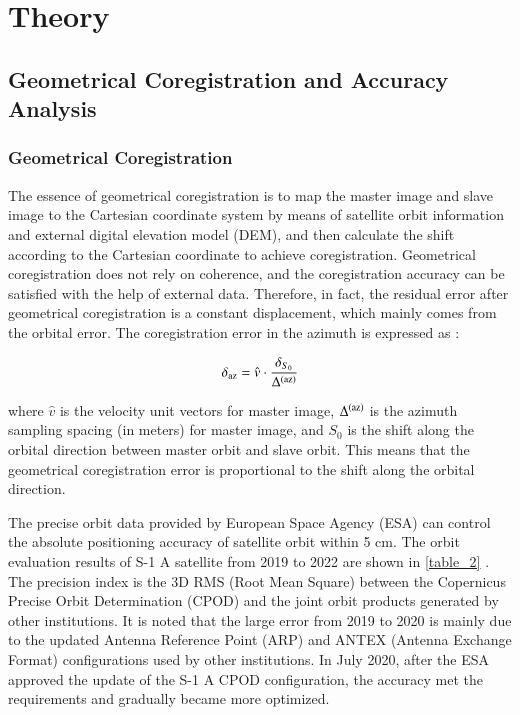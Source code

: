 \documentclass[preprint, authoryear]{elsarticle}
\begin{document}
\section{Theory}
\label{sec:2}


\subsection{Geometrical Coregistration and Accuracy Analysis}
\subsubsection{Geometrical Coregistration}

The essence of geometrical coregistration is to map the master image and slave image to the Cartesian coordinate system by means of satellite orbit information and external digital elevation model (DEM), and then calculate the shift according to the Cartesian coordinate to achieve coregistration. Geometrical coregistration does not rely on coherence, and the coregistration accuracy can be satisfied with the help of external data. Therefore, in fact, the residual error after geometrical coregistration is a constant displacement, which mainly comes from the orbital error. The coregistration error in the azimuth is expressed as \cite{Geometrical_SAR_image_registration}: \par

\begin{equation}
    \delta_{\rm az} = \hat{v} \cdot \frac{\delta_{S_0}}{\Delta^{({\rm az})}}
    \label{eq_8}
\end{equation}

\noindent where $\hat{v}$ is the velocity unit vectors for master image, $\Delta^{({\rm az})}$ is the azimuth sampling spacing (in meters) for master image, and $S_0$ is the shift along the orbital direction between master orbit and slave orbit. This means that the geometrical coregistration error is proportional to the shift along the orbital direction. \par
The precise orbit data provided by European Space Agency (ESA) can control the absolute positioning accuracy of satellite orbit within 5 cm. The orbit evaluation results of S-1 A satellite from 2019 to 2022 are shown in \ref{table_2} \cite{copernicus_review_2015.10-2019.09, copernicus_review_2019.10-2020.01, copernicus_review_2020.02-2020.05, copernicus_review_2020.06-2020.09, copernicus_review_2020.10-2020.12, copernicus_review_2021.01-2021.12, copernicus_review_2022.01-2022.12}. The precision index is the 3D RMS (Root Mean Square) between the Copernicus Precise Orbit Determination (CPOD) and the joint orbit products generated by other institutions. It is noted that the large error from 2019 to 2020 is mainly due to the updated Antenna Reference Point (ARP) and ANTEX (Antenna Exchange Format) configurations used by other institutions. In July 2020, after the ESA approved the update of the S-1 A CPOD configuration, the accuracy met the requirements and gradually became more optimized. \par
\end{document}
